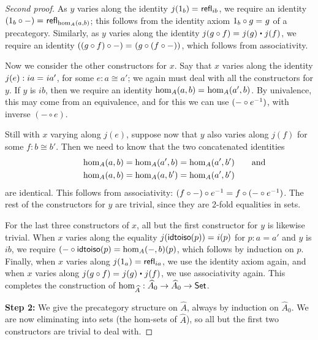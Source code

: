 \begin{proof}[Second proof]
  As $y$ varies along the identity $j(1_b) =_{} \mathsf{refl}_{ib}$, we require an identity $(1_b\circ -) =_{} \mathsf{refl}_{\hom_A(a,b)}$; this follows from the identity axiom $1_b\circ g =_{} g$ of a precategory.
  Similarly, as $y$ varies along the identity $\id{j(g\circ f)}{j(g)\ct j(f)}$, we require an identity $((g\circ f)\circ -) =_{} (g\circ (f\circ -))$, which follows from associativity.

  Now we consider the other constructors for $x$.
  Say that $x$ varies along the identity $j(e):ia =_{} ia'$, for some $e:a \cong a'$; we again must deal with all the constructors for $y$.
  If $y$ is $ib$, then we require an identity $\hom_A(a,b) =_{} \hom_A(a',b)$.
  By univalence, this may come from an equivalence, and for this we can use $(-\circ {e}^{-1})$, with inverse $(-\circ e)$.

  Still with $x$ varying along $j(e)$, suppose now that $y$ also varies along $j(f)$ for some $f:b\cong b'$.
  Then we need to know that the two concatenated identities
  \begin{gather*}
    \hom_A(a,b) = \hom_A(a',b) = \hom_A(a',b') \mathrlap{\qquad\text{and}}\\
    \hom_A(a,b) = \hom_A(a,b') = \hom_A(a',b')
  \end{gather*}
  are identical.
  This follows from associativity: $(f\circ -)\circ {e}^{-1} = f\circ (-\circ {e}^{-1})$.
  The rest of the constructors for $y$ are trivial, since they are 2-fold equalities in sets.

  For the last three constructors of $x$, all but the first constructor for $y$ is likewise trivial.
  When $x$ varies along the equality $j(\mathsf{idtoiso}(p)) =_{} {i}\!\left({p}\right)$ for $p:a=a'$ and $y$ is $ib$, we require $(-\circ \mathsf{idtoiso}(p) = {\hom_A(-,b)}\!\left({p}\right)$, which follows by induction on $p$.
  Finally, when $x$ varies along $j(1_a)=\mathsf{refl}_{ia}$, we use the identity axiom again, and when $x$ varies along $\id{j(g\circ f)}{j(g)\ct j(f)}$, we use associativity again.
  This completes the construction of $\hom_{\widehat A}:\widehat A_0 \to \widehat A_0 \to \mathsf{Set}$.

  \medskip

  \textbf{Step 2:} We give the precategory structure on $\widehat A$, always by induction on $\widehat A_0$.
  We are now eliminating into sets (the hom-sets of $\widehat A$), so all but the first two constructors are trivial to deal with.


\end{proof}
